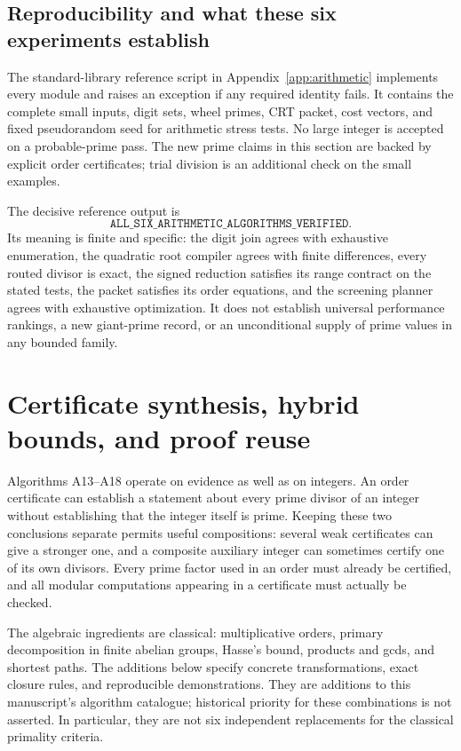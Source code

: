 \documentclass[11pt,a4paper]{article}
\theoremstyle{definition}\newtheorem{definition}[theorem]{Definition}
\theoremstyle{remark}\newtheorem{remark}[theorem]{Remark}
\begin{document}
\subsection{Reproducibility and what these six experiments establish}
\label{sec:arith18-verification}

The standard-library reference script in Appendix~\ref{app:arithmetic}
implements every module and raises an
exception if any required identity fails. It contains the complete small
inputs, digit sets, wheel primes, CRT packet, cost vectors, and fixed
pseudorandom seed for arithmetic stress tests. No large integer is accepted
on a probable-prime pass. The new prime claims in this section are backed
by explicit order certificates; trial division is an additional check on
the small examples.

The decisive reference output is
\[
 \texttt{ALL\_SIX\_ARITHMETIC\_ALGORITHMS\_VERIFIED}.
\]
Its meaning is finite and specific: the digit join agrees with exhaustive
enumeration, the quadratic root compiler agrees with finite differences,
every routed divisor is exact, the signed reduction satisfies its range
contract on the stated tests, the packet satisfies its order equations,
and the screening planner agrees with exhaustive optimization.
It does not establish universal performance rankings, a new giant-prime
record, or an unconditional supply of prime values in any bounded family.


\section{Certificate synthesis, hybrid bounds, and proof reuse}
\label{sec:cert-synthesis}

Algorithms A13--A18 operate on evidence as well as on integers.  An order
certificate can establish a statement about every prime divisor of an
integer without establishing that the integer itself is prime.  Keeping
these two conclusions separate permits useful compositions: several weak
certificates can give a stronger one, and a composite auxiliary integer can
sometimes certify one of its own divisors.  Every prime factor used in an
order must already be certified, and all modular computations appearing in
a certificate must actually be checked.

The algebraic ingredients are classical: multiplicative orders,
primary decomposition in finite abelian groups, Hasse's bound, products
and gcds, and shortest paths.  The additions below specify concrete
transformations, exact closure rules, and reproducible demonstrations.
They are additions to this manuscript's algorithm catalogue; historical
priority for these combinations is not asserted.  In particular, they are
not six independent replacements for the classical primality criteria.
\end{document}
